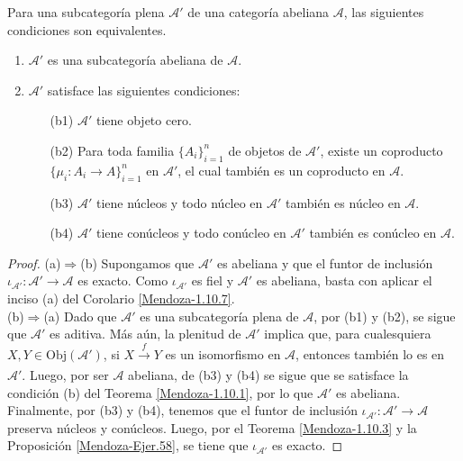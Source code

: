 \documentclass[tesis]{subfiles}
\begin{document}
\begin{Prop}\label{Mendoza-1.10.8}
    Para una subcategoría plena $\mathscr{A}'$ de una categoría abeliana $\mathscr{A}$, las siguientes condiciones son equivalentes.

    \begin{enumerate}[label=(\alph*)]
    
        \item $\mathscr{A}'$ es una subcategoría abeliana de $\mathscr{A}$.

        \item $\mathscr{A}'$ satisface las siguientes condiciones:

            \begin{itemize}
            
                \item[(b1)] $\mathscr{A}'$ tiene objeto cero.

                \item[(b2)] Para toda familia $\{A_i\}_{i=1}^n$ de objetos de $\mathscr{A}'$, existe un coproducto $\{\mu_i:A_i\to A\}_{i=1}^n$ en $\mathscr{A}'$, el cual también es un coproducto en $\mathscr{A}$.

                \item[(b3)] $\mathscr{A}'$ tiene núcleos y todo núcleo en $\mathscr{A}'$ también es núcleo en $\mathscr{A}$.

                \item[(b4)] $\mathscr{A}'$ tiene conúcleos y todo conúcleo en $\mathscr{A}'$ también es conúcleo en $\mathscr{A}$.
            \end{itemize}
    \end{enumerate}
\end{Prop}

\begin{proof}\leavevmode

    (a)$\Rightarrow$(b) Supongamos que $\mathscr{A}'$ es abeliana y que el funtor de inclusión $\iota_{\mathscr{A}'}:\mathscr{A}'\to \mathscr{A}$ es exacto. Como $\iota_{\mathscr{A}'}$ es fiel y $\mathscr{A}'$ es abeliana, basta con aplicar el inciso (a) del Corolario \ref{Mendoza-1.10.7}. \\

    (b)$\Rightarrow$(a) Dado que $\mathscr{A}'$ es una subcategoría plena de $\mathscr{A}$, por (b1) y (b2), se sigue que $\mathscr{A}'$ es aditiva. Más aún, la plenitud de $\mathscr{A}'$ implica que, para cualesquiera $X,Y\in\text{Obj}(\mathscr{A}')$, si $X\xrightarrow[]{f}Y$ es un isomorfismo en $\mathscr{A}$, entonces también lo es en $\mathscr{A}'$. Luego, por ser $\mathscr{A}$ abeliana, de (b3) y (b4) se sigue que se satisface la condición (b) del Teorema \ref{Mendoza-1.10.1}, por lo que $\mathscr{A}'$ es abeliana. Finalmente, por (b3) y (b4), tenemos que el funtor de inclusión $\iota_{\mathscr{A}'}:\mathscr{A}'\to \mathscr{A}$ preserva núcleos y conúcleos. Luego, por el Teorema \ref{Mendoza-1.10.3} y la Proposición \ref{Mendoza-Ejer.58}, se tiene que $\iota_{\mathscr{A}'}$ es exacto.
\end{proof}
\end{document}
